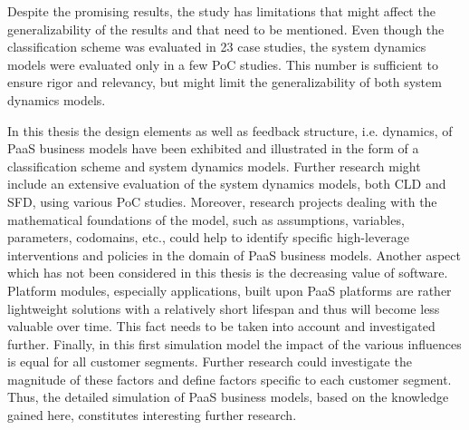 Despite the promising results, the study has limitations that might affect the generalizability of the results and that need to be mentioned. Even though the classification scheme was evaluated in 23 case studies, the system dynamics models were evaluated only in a few \ac{PoC} studies. This number is sufficient to ensure rigor and relevancy, but might limit the generalizability of both system dynamics models.

In this thesis the design elements as well as feedback structure, i.e. dynamics, of \ac{PaaS} business models have been exhibited and illustrated in the form of a classification scheme and system dynamics models. Further research might include an extensive evaluation of the system dynamics models, both \ac{CLD} and \ac{SFD}, using various \ac{PoC} studies. Moreover, research projects dealing with the mathematical foundations of the model, such as assumptions, variables, parameters, codomains, etc., could help to identify specific high-leverage interventions and policies in the domain of \ac{PaaS} business models. Another aspect which has not been considered in this thesis is the decreasing value of software. Platform modules, especially applications, built upon \ac{PaaS} platforms are rather lightweight solutions with a relatively short lifespan and thus will become less valuable over time. This fact needs to be taken into account and investigated further. Finally, in this first simulation model the impact of the various influences is equal for all customer segments. Further research could investigate the magnitude of these factors and define factors specific to each customer segment. Thus, the detailed simulation of \ac{PaaS} business models, based on the knowledge gained here, constitutes interesting further research.
